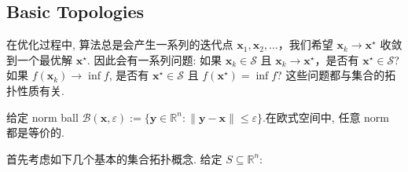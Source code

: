 \documentclass[11pt,UTF8,scheme=plain,fontset=fandol,linespread=1.3]{ctexart}
\numberwithin{figure}{section}
\begin{document}
\subsection{Basic Topologies}

在优化过程中, 算法总是会产生一系列的迭代点 $\bm{x}_1, \bm{x}_2, \ldots$，我们希望 $\bm{x}_k \to \bm{x}^\star$ 收敛到一个最优解 $\bm{x}^\star$. 因此会有一系列问题: 如果 $\bm{x}_k \in \mathcal{S}$ 且 $\bm{x}_k \to \bm{x}^\star$，是否有 $\bm{x}^\star \in \mathcal{S}$? 如果 $f(\bm{x}_k) \to \inf f$, 是否有 $\bm{x}^\star \in \mathcal{S}$ 且 $f(\bm{x}^\star) = \inf f$? 这些问题都与集合的拓扑性质有关.

给定 norm ball $\mathcal{B}(\bm{x}, \varepsilon) := \{\bm{y} \in \mathbb{R}^n: \|\bm{y}-\bm{x}\| \leq \varepsilon\}$.在欧式空间中, 任意 norm 都是等价的.

首先考虑如下几个基本的集合拓扑概念. 给定 $S \subseteq \mathbb{R}^n$:
\end{document}
